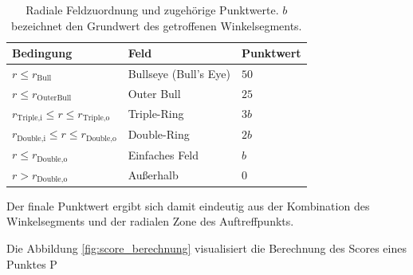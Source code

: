 \begin{table}[H]
    \centering
    \begin{tabular}{lll}
        \hline
        \textbf{Bedingung} & \textbf{Feld} & \textbf{Punktwert} \\
        \hline
        $r \leq r_{\text{Bull}}$                              & Bullseye (Bull's Eye) & $50$ \\
        $r \leq r_{\text{OuterBull}}$                         & Outer Bull            & $25$ \\
        $r_{\text{Triple,i}} \leq r \leq r_{\text{Triple,o}}$ & Triple-Ring           & $3b$ \\
        $r_{\text{Double,i}} \leq r \leq r_{\text{Double,o}}$ & Double-Ring           & $2b$ \\
        $r \leq r_{\text{Double,o}}$                          & Einfaches Feld        & $b$  \\
        $r > r_{\text{Double,o}}$                             & Außerhalb             & $0$  \\
        \hline
    \end{tabular}
    \caption{Radiale Feldzuordnung und zugehörige Punktwerte. $b$ bezeichnet den
    Grundwert des getroffenen Winkelsegments.}
    \label{tab:dart_zones}
\end{table}

Der finale Punktwert ergibt sich damit eindeutig aus der Kombination des
Winkelsegments und der radialen Zone des Auftreffpunkts.


Die Abbildung \ref{fig:score_berechnung} visualisiert die Berechnung des Scores eines Punktes P

